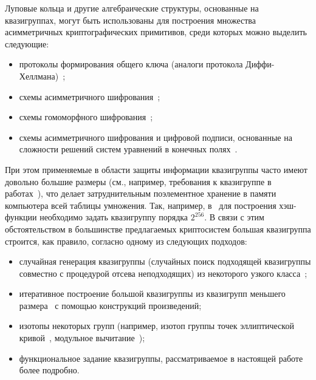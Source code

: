     Луповые кольца и другие алгебраические структуры, основанные на квазигруппах, могут быть использованы для построения множества асимметричных криптографических примитивов, среди которых можно выделить следующие:
    \begin{itemize}
        \item протоколы формирования общего ключа (аналоги протокола Диффи-Хеллмана)~\autocite{DH14, DH16, baryshnikov2017key, quantum18};
        \item схемы асимметричного шифрования~\autocite{markov12, pke10, gribovphd};
        \item схемы гомоморфного шифрования~\autocite{gribovphd, homomo15, katyshev2020application, markov20};
        \item схемы асимметричного шифрования и цифровой подписи, основанные на сложности решений систем уравнений в конечных полях~\autocite{gligoroski2008public, gligoroski2008multivariate, chen2010multivariate, gligoroski2011mqq}.
    \end{itemize}

    При этом применяемые в области защиты информации квазигруппы часто имеют довольно большие размеры (см., например, требования к квазигруппе в работах~\autocite{EdonR, EdonRprime, chen2010multivariate}), что делает затруднительным поэлементное хранение в памяти компьютера всей таблицы умножения. 
    Так, например, в~\autocite{EdonRprime} для построения хэш-функции необходимо задать квазигруппу порядка $2^{256}$. 
    В связи с этим обстоятельством в большинстве предлагаемых криптосистем большая квазигруппа строится, как правило, согласно одному из следующих подходов:
    \begin{itemize}
        \item случайная генерация квазигруппы (случайных поиск подходящей квазигруппы совместно с процедурой отсева неподходящих) из некоторого узкого класса~\autocite{gligoroski2008public, chen2010multivariate};
        \item итеративное построение большой квазигруппы из квазигрупп меньшего размера~\autocite{EdonRprime, gribovphd} с помощью конструкций произведений;
        \item изотопы некоторых  групп (например, изотоп группы точек эллиптической кривой~\autocite{DH16}, модульное вычитание~\autocite{snavsel2009hash});
        \item функциональное задание квазигруппы, рассматриваемое в настоящей работе более подробно.
    \end{itemize}

